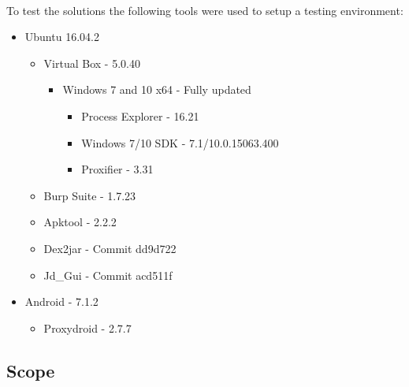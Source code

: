 \paragraph{}
To test the solutions the following tools were used to setup a testing environment:
\begin{itemize}
    \item Ubuntu 16.04.2
    \begin{itemize}
        \item Virtual Box - 5.0.40
        \begin{itemize}
            \item Windows 7 and 10 x64 - Fully updated
            \begin{itemize}
                \item Process Explorer - 16.21
                \item Windows 7/10 SDK - 7.1/10.0.15063.400
                \item Proxifier - 3.31
            \end{itemize}
        \end{itemize}
        \item Burp Suite - 1.7.23
        \item Apktool - 2.2.2
        \item Dex2jar - Commit dd9d722
        \item Jd\_Gui - Commit acd511f
    \end{itemize}
    \item Android - 7.1.2
    \begin{itemize}
        \item Proxydroid - 2.7.7
    \end{itemize}
\end{itemize}

\subsection{Scope}
\paragraph{}

